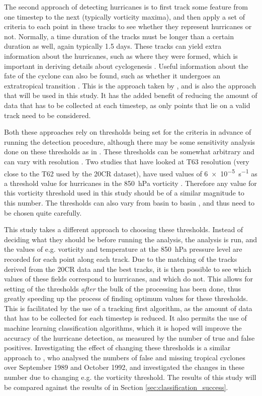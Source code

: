 \documentclass[pdftex,12pt,a4paper]{report}
\begin{document}
The second approach of detecting hurricanes is to first track some feature from one timestep to the
next (typically vorticity maxima), and then apply a set of criteria to each point in these tracks to
see whether they represent hurricanes or not. Normally, a time duration of the tracks must be longer
than a certain duration as well, again typically 1.5 days. These tracks can yield extra information
about the hurricanes, such as where they were formed, which is important in deriving details about
cyclogenesis \parencite{marchok2002ncep}. Useful information about the fate of the cyclone can also
be found, such as whether it undergoes an extratropical transition
\parencite{studholme2014objective}. This is the approach taken by \textcite{thorncroft2001african,
camargo2002improving}, and is also the approach that will be used in this study. It has the added
benefit of reducing the amount of data that has to be collected at each timestep, as only points
that lie on a valid track need to be considered.

Both these approaches rely on thresholds being set for the criteria in advance of running the
detection procedure, although there may be some sensitivity analysis done on these thresholds as in
\textcite{walsh1997objective}. These thresholds can be somewhat arbitrary and can vary with resolution
\parencite{walsh2007objectively}. Two studies that have looked at T63 resolution (very close to the T62 used by
the 20CR dataset), have used values of \SI{6e-5}{s^{-1}} as a threshold value for hurricanes in the
\SI{850}{hPa} vorticity \parencite{bengtsson2006storm, bengtsson2007may}. Therefore any value for
this vorticity threshold used in this study should be of a similar magnitude to this number. The
thresholds can also vary from basin to basin \parencite{camargo2002improving}, and thus need to be
chosen quite carefully.

This study takes a different approach to choosing these thresholds. Instead of deciding what they
should be before running the analysis, the analysis is run, and the values of e.g. vorticity and
temperature at the \SI{850}{hPa} pressure level are recorded for each point along each track. Due to
the matching of the tracks derived from the 20CR data and the best tracks, it is then possible to
see which values of these fields correspond to hurricanes, and which do not. This allows for setting
of the thresholds \textit{after} the bulk of the processing has been done, thus greatly speeding up
the process of finding optimum values for these thresholds. This is facilitated by the use of a
tracking first algorithm, as the amount of data that has to be collected for each
timestep is reduced. It also permits the use of machine learning classification algorithms, which it
is hoped will improve the accuracy of the hurricane detection, as measured by the number of true and
false positives. Investigating the effect of changing these thresholds is a similar approach to
\textcite{walsh1997objective}, who analysed the numbers of false and missing tropical cyclones over
September 1989 and October 1992, and investigated the changes in these number due to changing e.g.
the vorticity threshold. The results of this study will be compared against the results of
\textcite{walsh1997objective} in Section \ref{sec:classification_success}. 
\end{document}
